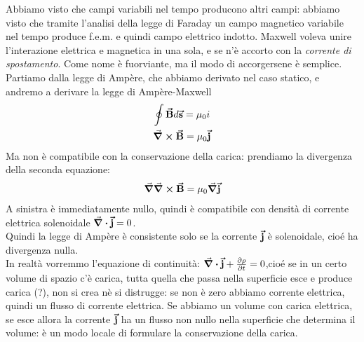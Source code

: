 Abbiamo visto che campi variabili nel tempo producono altri campi: abbiamo visto che tramite l'analisi della legge di Faraday un campo magnetico variabile nel tempo produce f.e.m. e quindi campo elettrico indotto. Maxwell voleva unire l'interazione elettrica e magnetica in una sola, e se n'è accorto con la \textit{corrente di spostamento}. Come nome è fuorviante, ma il modo di accorgersene è semplice.\\
Partiamo dalla legge di Ampère, che abbiamo derivato nel caso statico, e andremo a derivare la legge di Ampère-Maxwell
\begin{gather*}
	\oint\vb*{\va{B}}d\vb*{\va{s}}=\mu_0 i\\
	\curl\vb*{\va{B}}=\mu_0\vb*{\va{j}}
\end{gather*}
Ma non è compatibile con la conservazione della carica: prendiamo la divergenza della seconda equazione: 
\begin{gather*}
	\grad\curl\vb*{\va{B}}=\mu_0\grad\vb*{\va{j}}
\end{gather*}
A sinistra è immediatamente nullo, quindi è compatibile con densità di corrente elettrica solenoidale $\div\vb*{\va{j}}=0$.\\
Quindi la legge di Ampère è consistente solo se la corrente $\vb*{\va{j}}$ è solenoidale, cioé ha divergenza nulla.\\
In realtà vorremmo l'equazione di continuità: $\div\vb*{\va{j}}+\pdv{\rho}{t}=0$,cioé se in un certo volume di spazio c'è carica, tutta quella che passa nella superficie esce e produce carica (?), non si crea nè si distrugge: se non è zero abbiamo corrente elettrica, quindi un flusso di corrente elettrica. Se abbiamo un volume con carica elettrica, se esce allora la corrente $\vb*{\va{j}}$ ha un flusso non nullo nella superficie che determina il volume: è un modo locale di formulare la conservazione della carica.\\

